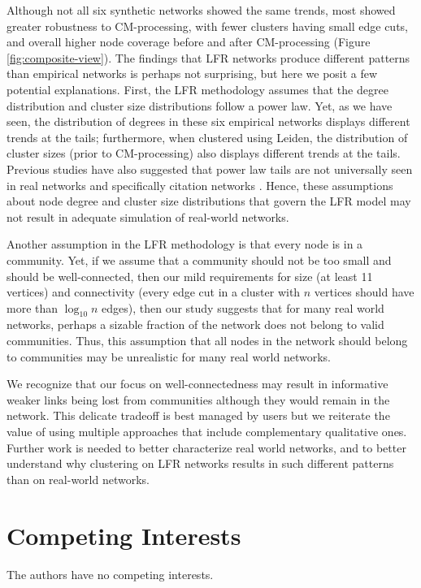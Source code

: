 \documentclass[11pt]{article}   	%
\begin{document}
Although not all six synthetic networks showed the same trends, most showed greater robustness to CM-processing, with fewer clusters having small edge cuts, and overall higher node coverage before and after CM-processing (Figure \ref{fig:composite-view}). The findings that LFR networks produce different patterns than empirical networks is perhaps not surprising, but here we posit a few potential explanations.
First, the LFR methodology assumes that the degree distribution and cluster size distributions follow a power law.
Yet, as we have seen, the distribution of degrees in these six empirical networks displays different trends at the tails; furthermore, when clustered using Leiden, the distribution of cluster sizes (prior to CM-processing) also displays different trends at the tails. Previous studies have also suggested that power law tails are not universally seen in real networks and specifically citation networks \citep{artico2020rare,brzezinski2015power}. Hence, these assumptions about node degree and cluster size distributions that govern the LFR model may not result in adequate simulation of real-world networks.

Another assumption in the LFR methodology is that every node is in a community.  Yet, if we assume that a community should not be too small and should be well-connected, then
our mild requirements for size (at least 11 vertices) and connectivity (every edge cut in a cluster with $n$ vertices should have more than $\log_{10}n$ edges), then our
study suggests that for many real world networks, perhaps a sizable fraction of the network does not belong to valid communities.
Thus, this assumption that all nodes in the network should belong to communities may be unrealistic for many real world networks.

We recognize that our focus on well-connectedness may result in informative weaker links \citep{granovetter1973strength} being lost from communities although they would remain in the network. This delicate tradeoff is best managed by
users but we reiterate the value of using multiple approaches that include complementary qualitative ones. Further work is needed to better characterize real world networks, and to better understand why clustering on LFR networks results in such different patterns than on real-world networks.

\section*{Competing Interests} \vspace{3mm} The authors have no competing interests.
\end{document}
